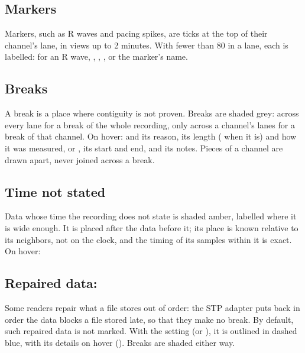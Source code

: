 \subsection{Markers}
\label{sec:vitalstream-markers}

Markers, such as R waves and pacing spikes, are ticks at the top of their channel's lane, in
views up to 2 minutes. With fewer than 80 in a lane, each is labelled:  for an R wave,
, , , or the marker's name.

\subsection{Breaks}
\label{sec:vitalstream-breaks}

A break is a place where contiguity is not proven. Breaks are shaded grey: across every lane
for a break of the whole recording, only across a channel's lanes for a break of that channel. On
hover:  and its reason, its length ( when it is) and how it
was measured, or , its start and end, and its notes. Pieces of a
channel are drawn apart, never joined across a break.

\subsection{Time not stated}
\label{sec:vitalstream-untimed}

Data whose time the recording does not state is shaded amber, labelled 
where it is wide enough. It is placed after the data before it; its place is known relative to
its neighbors, not on the clock, and the timing of its samples within it is exact. On hover:

\subsection{Repaired data: \texorpdfstring{}{qc\_verbose}}
\label{sec:vitalstream-qc}

Some readers repair what a file stores out of order: the STP adapter puts back in order the data
blocks a file stored late, so that they make no break. By default, such repaired data is not
marked. With the setting  (or ), it is outlined in dashed
blue, with its details on hover (). Breaks are shaded
either way.


